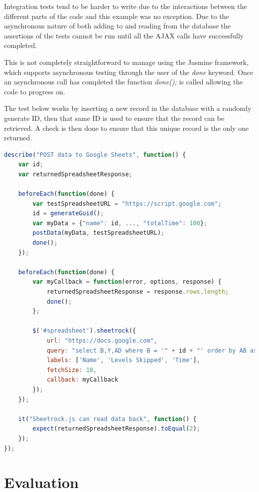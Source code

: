 \documentclass[12pt,a4paper]{report}
\begin{document}
Integration tests tend to be harder to write due to the interactions between the different parts of the code and this example was no exception. Due to the asynchronous nature of both adding to and reading from the database the assertions of the tests cannot be run until all the AJAX calls have successfully completed. 

This is not completely straightforward to manage using the Jasmine framework, which supports asynchronous testing through the user of the \textit{done} keyword. Once an asynchronous call has completed the function \textit{done();} is called allowing the code to progress on. 

The test below works by inserting a new record in the database with a randomly generate ID, then that same ID is used to ensure that the record can be retrieved. A check is then done to ensure that this unique record is the only one returned. 

\begin{minipage}{\linewidth}
\begin{lstlisting}[language=JavaScript]
describe("POST data to Google Sheets", function() {
    var id;
    var returnedSpreadsheetResponse;

    beforeEach(function(done) {
        var testSpreadsheetURL = "https://script.google.com";
        id = generateGuid();
        var myData = {"name": id, ..., "totalTime": 100};
        postData(myData, testSpreadsheetURL);
        done();
    });

    beforeEach(function(done) {
        var myCallback = function(error, options, response) {
            returnedSpreadsheetResponse = response.rows.length;
            done();
        };

        $('#spreadsheet').sheetrock({
            url: "https://docs.google.com",
            query: "select B,Y,AD where B = '" + id + "' order by AB asc",
            labels: ['Name', 'Levels Skipped', 'Time'],
            fetchSize: 10,
            callback: myCallback
        });
    });

    it("Sheetrock.js can read data back", function() {
        expect(returnedSpreadsheetResponse).toEqual(2);
    });
});
\end{lstlisting}
\end{minipage}

\chapter{Evaluation}
\end{document}
